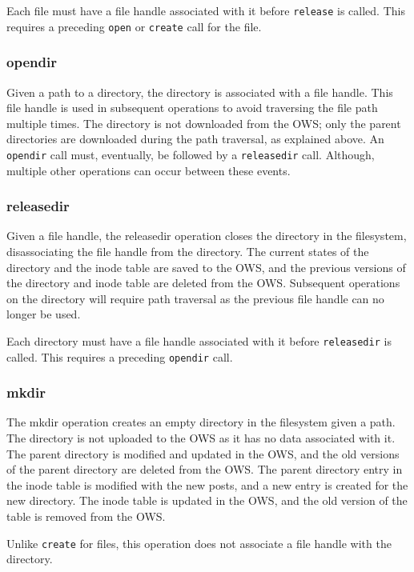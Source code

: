 Each file must have a file handle associated with it before \texttt{release} is called. This requires a preceding \texttt{open} or \texttt{create} call for the file.

\subsubsection{opendir}
Given a path to a directory, the directory is associated with a file handle. This file handle is used in subsequent operations to avoid traversing the file path multiple times. The directory is not downloaded from the \gls{OWS}; only the parent directories are downloaded during the path traversal, as explained above. An \texttt{opendir} call must, eventually, be followed by a \texttt{releasedir} call. Although, multiple other operations can occur between these events.

\subsubsection{releasedir}
Given a file handle, the releasedir operation closes the directory in the filesystem, disassociating the file handle from the directory. The current states of the directory and the inode table are saved to the \gls{OWS}, and the previous versions of the directory and inode table are deleted from the \gls{OWS}. Subsequent operations on the directory will require path traversal as the previous file handle can no longer be used.

Each directory must have a file handle associated with it before \texttt{releasedir} is called. This requires a preceding \texttt{opendir} call.

\subsubsection{mkdir}
The mkdir operation creates an empty directory in the filesystem given a path. The directory is not uploaded to the \gls{OWS} as it has no data associated with it. The parent directory is modified and updated in the \gls{OWS}, and the old versions of the parent directory are deleted from the \gls{OWS}. The parent directory entry in the inode table is modified with the new posts, and a new entry is created for the new directory. The inode table is updated in the \gls{OWS}, and the old version of the table is removed from the \gls{OWS}.

Unlike \texttt{create} for files, this operation does not associate a file handle with the directory.

